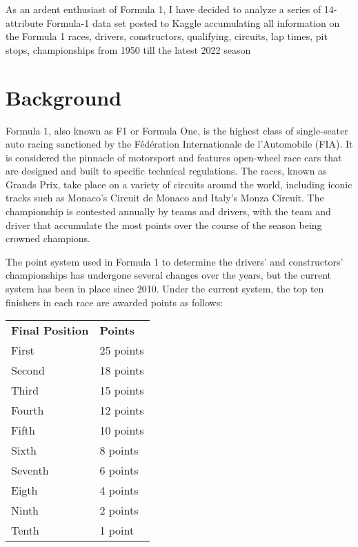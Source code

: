 \documentclass[10pt,twocolumn,letterpaper]{article}
\begin{document}
As an ardent enthusiast of Formula 1, I have decided to analyze a series of 14-attribute Formula-1 data set posted to Kaggle \cite{kagglef1main} accumulating all information on the Formula 1 races, drivers, constructors, qualifying, circuits, lap times, pit stops, championships from 1950 till the latest 2022 season

\section{Background}
Formula 1, also known as F1 or Formula One, is the highest class of single-seater auto racing sanctioned by the Fédération Internationale de l'Automobile (FIA). It is considered the pinnacle of motorsport and features open-wheel race cars that are designed and built to specific technical regulations. The races, known as Grands Prix, take place on a variety of circuits around the world, including iconic tracks such as Monaco's Circuit de Monaco and Italy's Monza Circuit. The championship is contested annually by teams and drivers, with the team and driver that accumulate the most points over the course of the season being crowned champions. 

The point system used in Formula 1 to determine the drivers' and constructors' championships has undergone several changes over the years, but the current system has been in place since 2010. Under the current system, the top ten finishers in each race are awarded points as follows:
\begin{table}[]
\begin{tabular}{ll}
\textbf{Final Position} & \textbf{Points} \\
First                   & 25 points       \\
Second                  & 18 points       \\
Third                   & 15 points       \\
Fourth                  & 12 points       \\
Fifth                   & 10 points       \\
Sixth                   & 8 points        \\
Seventh                 & 6 points        \\
Eigth                   & 4 points        \\
Ninth                   & 2 points        \\
Tenth                   & 1 point        
\end{tabular}
\end{table}
\end{document}
